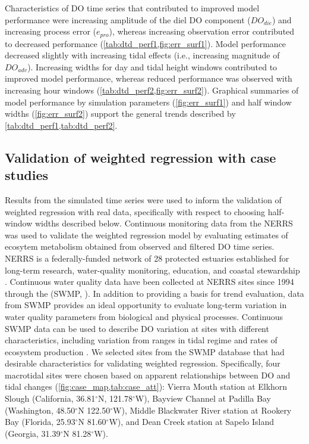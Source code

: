 \documentclass[letterpaper,12pt,oneside]{article}\usepackage[]{graphicx}\usepackage[]{color}
\begin{document}
Characteristics of \ac{DO} time series that contributed to improved model performance were increasing amplitude of the diel \ac{DO} component ($DO_{die}$) and increasing process error ($e_{pro}$), whereas increasing observation error contributed to decreased performance (\cref{tab:dtd_perf1,fig:err_surf1}).  Model performance decreased slightly with increasing tidal effects (i.e., increasing magnitude of $DO_{adv}$).  Increasing widths for day and tidal height windows contributed to improved model performance, whereas reduced performance was observed with increasing hour windows (\cref{tab:dtd_perf2,fig:err_surf2}).  Graphical summaries of model performance by simulation parameters (\cref{fig:err_surf1}) and half window widths (\cref{fig:err_surf2}) support the general trends described by \cref{tab:dtd_perf1,tab:dtd_perf2}.

\subsection{Validation of weighted regression with case studies}

Results from the simulated time series were used to inform the validation of weighted regression with real data, specifically with respect to choosing half-window widths described below.  Continuous monitoring data from the \acl{NERRS} was used to validate the weighted regression model by evaluating estimates of ecosytem metabolism obtained from observed and filtered \ac{DO} time series. \ac{NERRS} is a federally-funded network of 28 protected estuaries established for long-term research, water-quality monitoring, education, and coastal stewardship \citep{Wenner04}.  Continuous water quality data have been collected at \ac{NERRS} sites since 1994 through the  (\acs{SWMP}, ).  In addition to providing a basis for trend evaluation, data from \ac{SWMP} provides an ideal opportunity to evaluate long-term variation in water quality parameters from biological and physical processes.  Continuous \ac{SWMP} data can be used to describe \ac{DO} variation at sites with different characteristics, including variation from ranges in tidal regime \citep{Sanger02} and rates of ecosystem production \citep{Caffrey03,Caffrey04}.  We selected sites from the \ac{SWMP} database that had desirable characteristics for validating weighted regression.  Specifically, four macrotidal sites were chosen based on apparent relationships between \ac{DO} and tidal changes (\cref{fig:case_map,tab:case_att}): Vierra Mouth station at Elkhorn Slough (California, 36.81$^{\circ}$N, 121.78$^{\circ}$W), Bayview Channel at Padilla Bay (Washington, 48.50$^{\circ}$N 122.50$^{\circ}$W), Middle Blackwater River station at Rookery Bay (Florida, 25.93$^{\circ}$N 81.60$^{\circ}$W), and Dean Creek station at Sapelo Island (Georgia, 31.39$^{\circ}$N 81.28$^{\circ}$W).   
\end{document}
